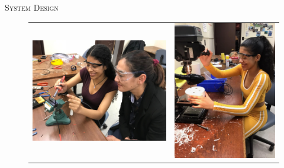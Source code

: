\documentclass[final,t]{beamer}
\begin{document}
\begin{frame}{}
\begin{columns}
\begin{column}{.5\linewidth}
\begin{block}{\textsc{System Design}}
                    \begin{center}
                    \begin{figure}
                    \begin{tabular}{cc}
                    \includegraphics[scale = 0.15]{assets/IMG_9097.JPG}
                    \hspace*{5mm}
                    &
                    \includegraphics[scale = 0.47]{assets/IMG_2627.jpg}

\end{tabular}
\end{figure}
\end{center}
\end{block}
\end{column}
\end{columns}
\end{frame}
\end{document}
